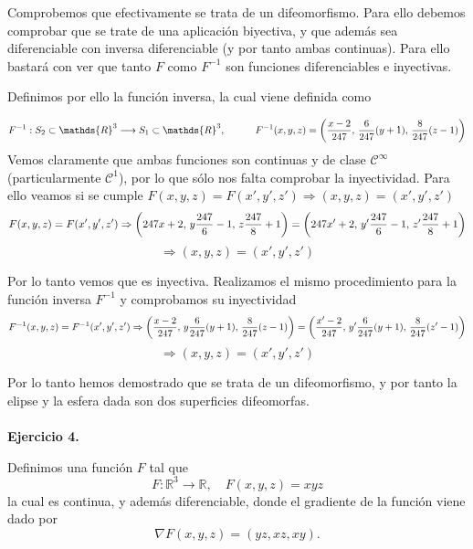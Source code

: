 \documentclass[fleqn]{article}
\def\R{\mathds{R}}
\begin{document}
        Comprobemos que efectivamente se trata de un difeomorfismo. Para ello debemos comprobar
        que se trate de una aplicación biyectiva, y que además sea diferenciable con inversa diferenciable  (y por tanto ambas continuas). Para ello
        bastará con ver que tanto $F$ como $F^{-1}$ son funciones diferenciables e inyectivas. 

        Definimos por ello la función inversa, la cual viene definida como

                $$F^{-1}: S_2\subset \R^3 \longrightarrow S_1\subset \R^3 , \quad \quad \quad
                F^{-1}(x,y,z)=\left(\frac{x-2}{247}, \thinspace \frac{6}{247}(y+1), \thinspace \frac{8}{247}(z - 1)\right)$$
        Vemos claramente que ambas funciones son continuas y de clase $\mathcal{C}^{\infty}$ (particularmente $\mathcal{C}^{1}$), por lo que sólo nos falta 
        comprobar la inyectividad. Para ello veamos si se cumple $F(x,y,z)=F(x',y',z') \Rightarrow (x,y,z)=(x',y',z')$
        $$F(x,y,z)=F(x',y',z') \Rightarrow \left(247x + 2, \thinspace y\frac{247}{6}-1, \thinspace z\frac{247}{8} + 1\right)=
        \left(247x' + 2, \thinspace y'\frac{247}{6}-1, \thinspace z'\frac{247}{8} + 1\right)$$
        $$\Rightarrow (x,y,z)=(x',y',z')$$

        Por lo tanto vemos que es inyectiva. Realizamos el mismo procedimiento para la función inversa $F^{-1}$ y comprobamos su inyectividad
        $$F^{-1}(x,y,z)=F^{-1}(x',y',z') \Rightarrow \left(\frac{x-2}{247}, \thinspace y\frac{6}{247}(y+1), \thinspace \frac{8}{247}(z - 1)\right) = 
        \left(\frac{x'-2}{247}, \thinspace y'\frac{6}{247}(y+1), \thinspace \frac{8}{247}(z' - 1)\right)$$
        $$\Rightarrow (x,y,z)=(x',y',z')$$

        Por lo tanto hemos demostrado que se trata de un difeomorfismo, y por tanto la elipse y la esfera dada son dos superficies difeomorfas.\\ \\



        \textbf{Ejercicio 4. } 
        
        Definimos una función $F$ tal que 
        $$F:\R^3 \rightarrow \R, \quad F(x,y,z)=xyz$$
        la cual es continua, y además diferenciable, donde el gradiente de la función viene dado por 
        $$\nabla F(x,y,z) = (yz,xz,xy).$$
\end{document}
